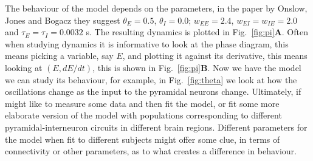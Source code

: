 \documentclass[11pt,a4paper]{scrartcl}
\begin{document}
The behaviour of the model depends on the parameters, in the paper by
Onslow, Jones and Bogacz they suggest $\theta_E=0.5$, $\theta_I=0.0$;
$w_{EE}=2.4$, $w_{EI}=w_{IE}=2.0$ and $\tau_E=\tau_I=0.0032$ s. The
resulting dynamics is plotted in Fig.~\ref{fig:pi}\textbf{A}. Often when
studying dynamics it is informative to look at the phase diagram, this
means picking a variable, say $E$, and plotting it against its
derivative, this means looking at $(E,dE/dt)$, this is shown in
Fig.~\ref{fig:pi}\textbf{B}. Now we have the model we can study its
behaviour, for example, in Fig.~\ref{fig:theta} we look at how the
oscillations change as the input to the pyramidal neurons
change. Ultimately, if might like to measure some data and then fit
the model, or fit some more elaborate version of the model with
populations corresponding to different pyramidal-interneuron circuits
in different brain regions. Different parameters for the model when
fit to different subjects might offer some clue, in terms of
connectivity or other parameters, as to what creates a difference in
behaviour.
\end{document}
